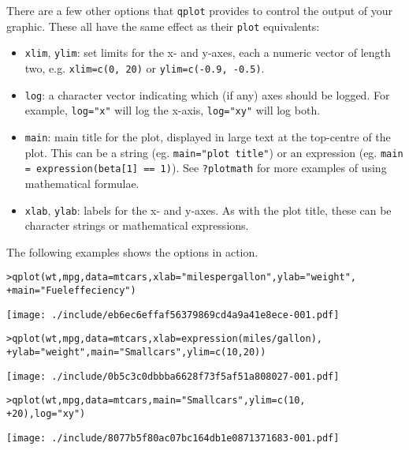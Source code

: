 There are a few other options that {\tt qplot} provides to control the output of your graphic.  These all have the same effect as their {\tt plot} equivalents:

\begin{itemize}
	\item {\tt xlim}, {\tt ylim}: set limits for the x- and y-axes, each a numeric vector of length two, e.g. {\tt xlim=c(0, 20)} or {\tt ylim=c(-0.9, -0.5)}.
	\item {\tt log}: a character vector indicating which (if any) axes should be logged.  For example, {\tt log="x"} will log the x-axis, {\tt log="xy"} will log both.
	\item {\tt main}: main title for the plot, displayed in large text at the top-centre of the plot.  This can be a string (eg. {\tt main="plot title"}) or an expression (eg. {\tt main = expression(beta[1] == 1)}).  See {\tt ?plotmath} for more examples of using mathematical formulae.
	\item {\tt xlab}, {\tt ylab}: labels for the x- and y-axes.  As with the plot title, these can be character strings or mathematical expressions.
\end{itemize}

The following examples shows the options in action.

\begin{alltt}
> qplot(wt, mpg, data = mtcars, xlab = "miles per gallon", ylab = "weight", 
+     main = "Fuel effeciency")
\end{alltt}
\texttt{[image: ./include/eb6ec6effaf56379869cd4a9a41e8ece-001.pdf]}
\begin{alltt}

> qplot(wt, mpg, data = mtcars, xlab = expression(miles/gallon), 
+     ylab = "weight", main = "Small cars", ylim = c(10, 20))
\end{alltt}
\texttt{[image: ./include/0b5c3c0dbbba6628f73f5af51a808027-001.pdf]}
\begin{alltt}

> qplot(wt, mpg, data = mtcars, main = "Small cars", ylim = c(10, 
+     20), log = "xy")
\end{alltt}
\texttt{[image: ./include/8077b5f80ac07bc164db1e0871371683-001.pdf]}
\begin{alltt}

\end{alltt}

